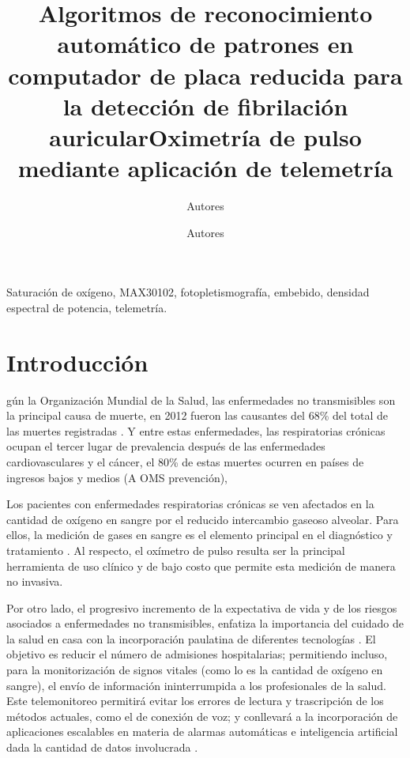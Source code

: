 \documentclass[journal]{IEEEtran}
\title{Algoritmos de reconocimiento automático de patrones en computador de placa reducida para la detección de fibrilación auricular}
\author{Autores \\ %
\and
Autores
 \\ \IEEEauthorblockN{Servicio Nacional de Aprendizaje, Centro de Electriciad Electrónica y Telecomunicaciones}
}
\begin{document}
\title{Oximetría de pulso mediante aplicación de telemetría}
\maketitle


\begin{abstract}



   
\end{abstract}
\IEEEpeerreviewmaketitle

\begin{IEEEkeywords}
	Saturación de oxígeno, MAX30102, fotopletismografía, embebido, densidad espectral de potencia, telemetría.
\end{IEEEkeywords}


\section{Introducción}



gún la Organización Mundial de la Salud, las enfermedades no transmisibles son la principal causa de muerte, en 2012 fueron las causantes del 68\% del total de las muertes registradas \cite{A_OMS_informe}. Y entre estas enfermedades, las respiratorias crónicas ocupan el tercer lugar de prevalencia después de las enfermedades cardiovasculares y el cáncer, el 80\% de estas muertes ocurren en países de ingresos bajos y medios  (A OMS prevención), \cite{A_OMS_prevencion}

Los pacientes con enfermedades respiratorias crónicas se ven afectados en la cantidad de oxígeno en sangre por el reducido intercambio gaseoso alveolar. Para ellos, la medición de gases en sangre es el elemento principal en el diagnóstico y tratamiento \cite{A_webster_spo2}.  Al respecto, el oxímetro de pulso resulta ser la principal herramienta de uso clínico y de bajo costo que permite esta medición de manera no invasiva.

Por otro lado, el progresivo incremento de la expectativa de vida y de los riesgos asociados a enfermedades no transmisibles, enfatiza la importancia del cuidado de la salud en casa con la incorporación paulatina de diferentes tecnologías \cite{A_webster_home_care}. El objetivo es reducir el número de admisiones hospitalarias; permitiendo incluso, para la monitorización de signos vitales (como lo es la cantidad de oxígeno en sangre), el envío de información ininterrumpida a los profesionales de la salud. Este telemonitoreo permitirá evitar los errores de lectura y trascripción de los métodos actuales, como el de conexión de voz; y conllevará  a la incorporación de aplicaciones escalables en materia de alarmas automáticas e inteligencia artificial dada la cantidad de datos involucrada \cite{A_telemedicina}.
\end{document}
